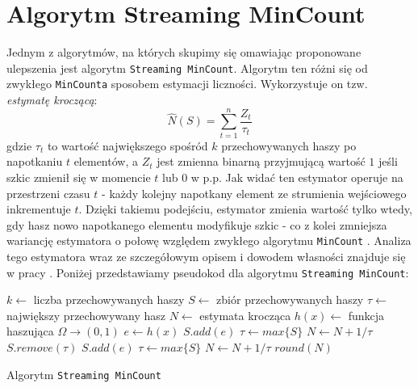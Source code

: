 \section{Algorytm Streaming MinCount}

Jednym z algorytmów, na których skupimy się omawiając proponowane ulepszenia jest algorytm \texttt{Streaming MinCount}. Algorytm ten różni się od zwykłego \texttt{MinCounta} sposobem estymacji liczności. Wykorzystuje on tzw. \textit{estymatę kroczącą}:
\begin{equation}
    \hat{N}(S) = \sum_{t=1}^{n} \frac{Z_t}{\tau_{t}}
\end{equation}
gdzie $\tau_{t}$ to wartość największego spośród $k$ przechowywanych haszy po napotkaniu $t$ elementów, a $Z_t$ jest zmienna binarną przyjmującą wartość $1$ jeśli szkic zmienił się w momencie $t$ lub $0$ w p.p. Jak widać ten estymator operuje na przestrzeni czasu $t$ - każdy kolejny napotkany element ze strumienia wejściowego inkrementuje $t$. Dzięki takiemu podejściu, estymator zmienia wartość tylko wtedy, gdy hasz nowo napotkanego elementu modyfikuje szkic - co z kolei zmniejsza wariancję estymatora o połowę względem zwykłego algorytmu \texttt{MinCount} \cite{ting}. Analiza tego estymatora wraz ze szczegółowym opisem i dowodem własności znajduje się w pracy \cite{streamed}. Poniżej przedstawiamy pseudokod dla algorytmu \texttt{Streaming MinCount}:
\newline
\begin{algorithm}
    \begin{algorithmic}
    \State $k \gets $ liczba przechowywanych haszy 
    \State $S \gets $ zbiór przechowywanych haszy
    \State $\tau \gets $ największy przechowywany hasz 
    \State $N \gets $ estymata krocząca
    \State $h(x) \gets $ funkcja haszująca $\Omega \rightarrow (0, 1)$
    \newline
        \State $e \gets h(x)$
                \State $S.add(e)$
                \State $\tau \gets max\{S\}$
                \State $N \gets N + 1/\tau$
                \State $S.remove(\tau)$
                \State $S.add(e)$
                \State $\tau \gets max\{S\}$
                \State $N \gets N + 1/\tau$
            \EndIf
        \EndIf
    \EndFunction
    \newline
        \State \Return $round(N)$
    \EndFunction
    
    \end{algorithmic}
    \caption{Algorytm \texttt{Streaming MinCount}}
\end{algorithm}

